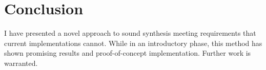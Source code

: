 \documentclass[twocolumn]{article}
\begin{document}
\section{Conclusion}

I have presented a novel approach to sound synthesis meeting requirements that current implementations cannot. While in an introductory phase, this method has shown promising results and proof-of-concept implementation. Further work is warranted.
\end{document}
